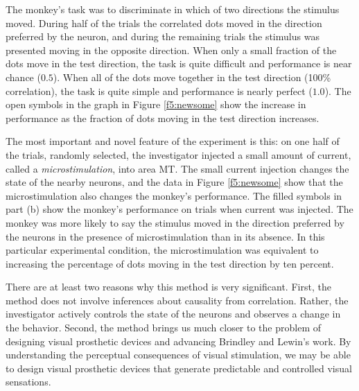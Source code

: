 The monkey's task was to discriminate in which of
two directions the stimulus moved.
During half of the trials the correlated dots moved
in the direction preferred by the neuron,
and during the
remaining trials the stimulus was presented moving
in the opposite direction.
When only a small fraction of the dots
move in the test direction, the task is quite difficult
and performance is near chance ($0.5$).
When all of the dots move together
in the test direction (100\% correlation),
the task is quite simple and performance is nearly perfect ($1.0$).
The open symbols in the graph in Figure \ref{f5:newsome} 
show the increase in performance
as the fraction of dots moving in the test direction increases.

The most important and novel feature of the experiment is this:
on one half of the trials, randomly selected, the investigator
injected a small amount of current, called a {\em microstimulation},
into area MT.
The small current injection changes the state of 
the nearby neurons, and
the data in Figure \ref{f5:newsome}
show that the microstimulation also
changes the monkey's performance.
The filled symbols in part (b) show the
monkey's performance on trials when current
was injected.
The monkey was more likely to say the stimulus moved in the
direction preferred by the neurons in the
presence of microstimulation than in its absence.
In this particular experimental condition,
the microstimulation was equivalent
to increasing the percentage of dots moving in
the test direction by ten percent.

There are at least two reasons why
this method is very significant.
First, the method does not involve inferences about
causality from correlation.
Rather, the investigator actively controls the state of
the neurons and observes a change in the behavior.
Second, the method brings us much closer to the problem
of designing visual prosthetic devices and advancing
Brindley and Lewin's work.
By understanding the perceptual consequences
of visual stimulation,
we may be able to design visual prosthetic devices
that generate predictable and controlled visual sensations.
